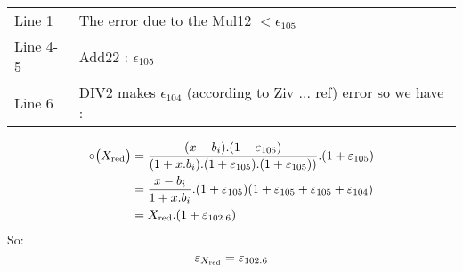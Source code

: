 \begin{tabular}{ll}
Line 1 & The error due to the Mul12 $< \epsilon_{105}$\\
Line 4-5 & Add22 : $\epsilon_{105}$\\
Line 6 & DIV2 makes $\epsilon_{104}$ (according to Ziv ... ref) error so we have :
\end{tabular}

\begin{equation}
\begin{split}
   \circ\big(X_{\mathrm{red}}\big) & = \frac{(x-b_i).(1+\varepsilon_{105})}{(1+x.b_i).(1+\varepsilon_{105})
          .(1+\varepsilon_{105}) )}.(1+\varepsilon_{105}) \\
         & =
          \frac{x-b_i}{1+x.b_i}.(1+\varepsilon_{105})(1+\varepsilon_{105}+\varepsilon_{105}+\varepsilon_{104})\\
         & = X_{\mathrm{red}} . (1+\varepsilon_{102.6})\nonumber
\end{split}
\end{equation}
So: 
\begin{equation}
\varepsilon_{X_{\mathrm{red}}} = \varepsilon_{102.6} \label{eps:equation}
\end{equation}
